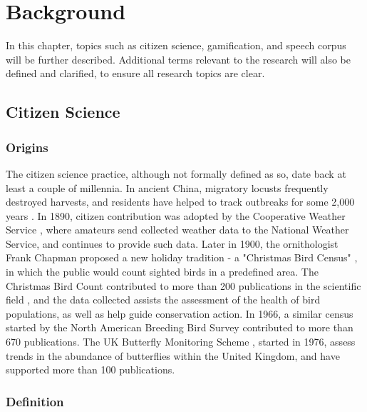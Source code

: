 \chapter{Background}

In this chapter, topics such as citizen science, gamification, and speech corpus will be further described. Additional terms relevant to the research will also be defined and clarified, to ensure all research topics are clear. 

\section{Citizen Science}

\subsection{Origins}

The citizen science practice, although not formally defined as so, date back at least a couple of millennia. In ancient China, migratory locusts frequently destroyed harvests, and residents have helped to track outbreaks for some 2,000 years \cite{irwin2018no}. In 1890, citizen contribution was adopted by the Cooperative Weather Service \cite{quayle1991effects}, where amateurs send collected weather data to the National Weather Service, and continues to provide such data. Later in 1900, the ornithologist Frank Chapman proposed a new holiday tradition - a "Christmas Bird Census" \cite{harden1985christmas}, in which the public would count sighted birds in a predefined area. The Christmas Bird Count contributed to more than 200 publications in the scientific field \cite{kosmala2016assessing}, and the data collected assists the assessment of the health of bird populations, as well as help guide conservation action. In 1966, a similar census started by the North American Breeding Bird Survey contributed to more than 670 publications. The UK Butterfly Monitoring Scheme \cite{pollard1994monitoring}, started in 1976, assess trends in the abundance of butterflies within the United Kingdom, and have supported more than 100 publications.

\subsection{Definition}

